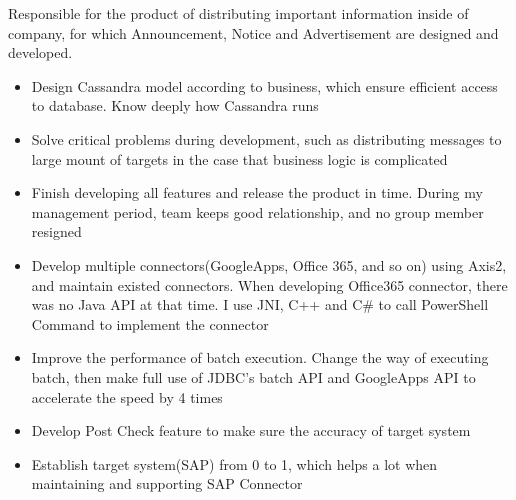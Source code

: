 \documentclass{resume}
\begin{document}

Responsible for the product of distributing important information inside of company, for which Announcement, Notice and Advertisement are designed and developed.
\begin{itemize}
  \item Design Cassandra model according to business, which ensure efficient access to database. Know deeply how Cassandra runs
  \item Solve critical problems during development, such as distributing messages to large mount of targets in the case that business logic is complicated
  \item Finish developing all features and release the product in time. During my management period, team keeps good relationship, and no group member resigned
\end{itemize}


\begin{itemize}
  \item Develop multiple connectors(GoogleApps, Office 365, and so on) using Axis2, and maintain existed connectors. When developing Office365 connector, there was no Java API at that time. I use JNI, C++ and C\# to call PowerShell Command to implement the connector
  \item Improve the performance of batch execution. Change the way of executing batch, then make full use of JDBC's batch API and  GoogleApps API to accelerate the speed by 4 times
  \item Develop Post Check feature to make sure the accuracy of target system
  \item Establish target system(SAP) from 0 to 1, which helps a lot when maintaining and supporting SAP Connector
\end{itemize}



%
%
\end{document}
